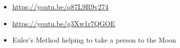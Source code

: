 \begin{video}
\begin{itemize}
	\item \href{https://youtu.be/q87L9R9v274}{https://youtu.be/q87L9R9v274} \hfill {}
	\item \href{https://youtu.be/g3Xw1r7QGOE}{https://youtu.be/g3Xw1r7QGOE} \hfill {}
	\item Euler's Method helping to take a person to the Moon \hfill {}
\end{itemize}	
\end{video}





